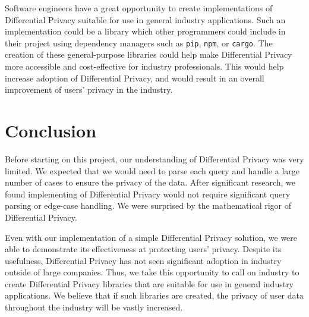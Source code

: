 \documentclass[conference,11pt]{IEEEtran}
\begin{document}
Software engineers have a great opportunity to create implementations of
Differential Privacy suitable for use in general industry applications. Such an
implementation could be a library which other programmers could include in their
project using dependency managers such as \texttt{pip}, \texttt{npm}, or
\texttt{cargo}. The creation of these general-purpose libraries could help make
Differential Privacy more accessible and cost-effective for industry
professionals. This would help increase adoption of Differential Privacy, and
would result in an overall improvement of users' privacy in the industry.

\section{Conclusion}\label{sec:conclusion}
Before starting on this project, our understanding of Differential Privacy was
very limited. We expected that we would need to parse each query and handle a
large number of cases to ensure the privacy of the data.  After significant
research, we found implementing of Differential Privacy would not require
significant query parsing or edge-case handling. We were surprised by the
mathematical rigor of Differential Privacy.

Even with our implementation of a simple Differential Privacy solution, we were 
able to demonstrate its effectiveness at protecting users' privacy. Despite its 
usefulness, Differential Privacy has not seen significant adoption in industry 
outside of large companies. Thus, we take this opportunity to call on industry to 
create Differential Privacy libraries that are suitable for use in general industry 
applications. We believe that if such libraries are created, the privacy of user
data throughout the industry will be vastly increased.

{\printbibliography}
\end{document}
